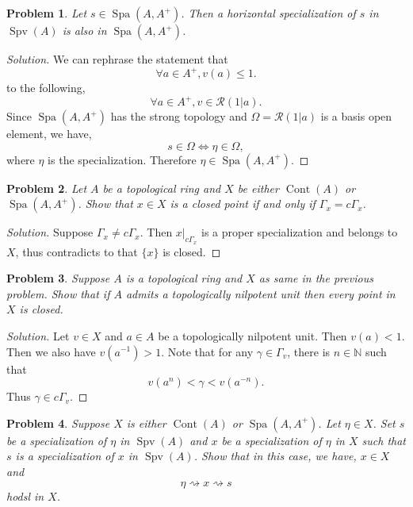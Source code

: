 \documentclass[8pt]{article}
\numberwithin{equation}{section}
\newenvironment{solution}{\begin{proof}[Solution]}{\end{proof}}
\newtheorem{problem}{Problem}[section]
\DeclareMathOperator{\Spa}{Spa}
\DeclareMathOperator{\Spv}{Spv}
\DeclareMathOperator{\Cont}{Cont}
\newcommand{\N}[0]{\mathbb{N}}
\newcommand{\cR}[0]{\mathcal{R}}
\newcommand{\cGamma}[0]{c\Gamma}
\begin{document}
\begin{problem}
  Let $s\in\Spa(A,A^+)$. Then a horizontal specialization of $s$ in $\Spv(A)$ is also in $\Spa(A,A^+)$.
\end{problem}
\begin{solution}
  We can rephrase the statement that 
  \begin{equation*}
    \forall a\in A^+, v(a)\leq 1.
  \end{equation*}
  to the following,
  \begin{equation*}
    \forall a\in A^+, v\in\cR(1|a).
  \end{equation*}
  Since $\Spa(A,A^+)$ has the strong topology and $\Omega=\cR(1|a)$ is a basis open element, we have,
  \begin{equation*}
    s\in \Omega\iff \eta\in\Omega,
  \end{equation*}
  where $\eta$ is the specialization. Therefore $\eta\in\Spa(A,A^+)$.
\end{solution}
\begin{problem}
  Let $A$ be a topological ring and $X$ be either $\Cont(A)$ or $\Spa(A,A^+)$. Show that $x\in X$ is a closed point if and only if $\Gamma_x = \cGamma_x$.
\end{problem}
\begin{solution}
  Suppose $\Gamma_x\not=\cGamma_x$. Then $x|_{\cGamma_x}$ is a proper specialization and belongs to $X$, thus contradicts to that $\{x\}$ is closed.
\end{solution}
\begin{problem}
  Suppose $A$ is a topological ring and $X$ as same in the previous problem. Show that if $A$ admits a topologically nilpotent unit then every point in $X$ is closed.
\end{problem}
\begin{solution}
  Let $v\in X$ and $a\in A$ be a topologically nilpotent unit. Then $v(a)<1$. Then we also have $v(a^{-1})>1$. Note that for any $\gamma\in\Gamma_v$, there is $n\in\N$ such that 
  \begin{equation*}
    v(a^n)<\gamma<v(a^{-n}).
  \end{equation*}
  Thus $\gamma\in\cGamma_v$.
\end{solution}
\begin{problem}
  Suppose $X$ is either $\Cont(A)$ or $\Spa(A,A^+)$. Let $\eta\in X$. Set $s$ be a specialization of $\eta$ in $\Spv(A)$ and $x$ be a specialization of $\eta$ in $X$ such that $s$ is a specialization of $x$ in $\Spv(A)$.
  Show that in this case, we have, $x\in X$ and 
  \begin{equation*}
    \eta\rightsquigarrow x\rightsquigarrow s
  \end{equation*}
  hodsl in $X$.
\end{problem}
\end{document}
